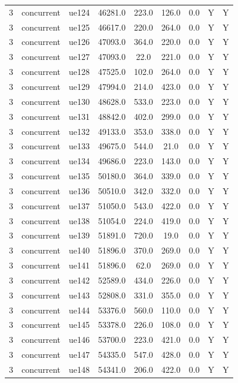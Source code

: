 \begin{table}[ht]
\begin{tabular}{|c|c|c|c|c|c|c|c|c|}
3 & concurrent & ue124 & 46281.0 & 223.0 & 126.0 & 0.0 & Y & Y \\
3 & concurrent & ue125 & 46617.0 & 220.0 & 264.0 & 0.0 & Y & Y \\
3 & concurrent & ue126 & 47093.0 & 364.0 & 220.0 & 0.0 & Y & Y \\
3 & concurrent & ue127 & 47093.0 & 22.0 & 221.0 & 0.0 & Y & Y \\
3 & concurrent & ue128 & 47525.0 & 102.0 & 264.0 & 0.0 & Y & Y \\
3 & concurrent & ue129 & 47994.0 & 214.0 & 423.0 & 0.0 & Y & Y \\
3 & concurrent & ue130 & 48628.0 & 533.0 & 223.0 & 0.0 & Y & Y \\
3 & concurrent & ue131 & 48842.0 & 402.0 & 299.0 & 0.0 & Y & Y \\
3 & concurrent & ue132 & 49133.0 & 353.0 & 338.0 & 0.0 & Y & Y \\
3 & concurrent & ue133 & 49675.0 & 544.0 & 21.0 & 0.0 & Y & Y \\
3 & concurrent & ue134 & 49686.0 & 223.0 & 143.0 & 0.0 & Y & Y \\
3 & concurrent & ue135 & 50180.0 & 364.0 & 339.0 & 0.0 & Y & Y \\
3 & concurrent & ue136 & 50510.0 & 342.0 & 332.0 & 0.0 & Y & Y \\
3 & concurrent & ue137 & 51050.0 & 543.0 & 422.0 & 0.0 & Y & Y \\
3 & concurrent & ue138 & 51054.0 & 224.0 & 419.0 & 0.0 & Y & Y \\
3 & concurrent & ue139 & 51891.0 & 720.0 & 19.0 & 0.0 & Y & Y \\
3 & concurrent & ue140 & 51896.0 & 370.0 & 269.0 & 0.0 & Y & Y \\
3 & concurrent & ue141 & 51896.0 & 62.0 & 269.0 & 0.0 & Y & Y \\
3 & concurrent & ue142 & 52589.0 & 434.0 & 226.0 & 0.0 & Y & Y \\
3 & concurrent & ue143 & 52808.0 & 331.0 & 355.0 & 0.0 & Y & Y \\
3 & concurrent & ue144 & 53376.0 & 560.0 & 110.0 & 0.0 & Y & Y \\
3 & concurrent & ue145 & 53378.0 & 226.0 & 108.0 & 0.0 & Y & Y \\
3 & concurrent & ue146 & 53700.0 & 223.0 & 421.0 & 0.0 & Y & Y \\
3 & concurrent & ue147 & 54335.0 & 547.0 & 428.0 & 0.0 & Y & Y \\
3 & concurrent & ue148 & 54341.0 & 206.0 & 422.0 & 0.0 & Y & Y \\

\end{tabular}
\end{table}
